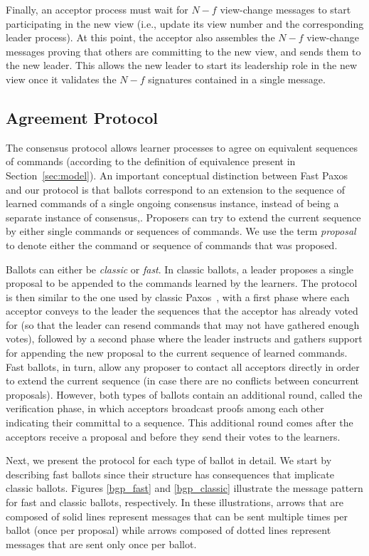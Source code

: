 Finally, an acceptor process must wait for $N-f$ view-change messages to start participating in the new view (i.e., update its view number and the corresponding leader process). At this point, the acceptor also assembles the $N-f$ view-change messages proving that others are committing to the new view, and sends them to the new leader. This allows the new leader to start its leadership role in the new view once it validates the $N-f$ signatures contained in a single message.

\subsection{Agreement Protocol} 

The consensus protocol allows learner processes to agree on equivalent sequences of commands (according to the definition of equivalence present in Section~\ref{sec:model}). An important conceptual distinction between Fast Paxos~\cite{L06} and our protocol is that ballots correspond to an extension to the sequence of learned commands of a single ongoing consensus instance, instead of being a separate instance of consensus,. Proposers can try to extend the current sequence by either single commands or sequences of commands. We use the term \textit{proposal} to denote either the command or sequence of commands that was proposed.\par
Ballots can either be \textit{classic} or \textit{fast}. In classic ballots, a leader proposes a single proposal to be appended to the commands learned by the learners. The protocol is then similar to the one used by classic Paxos~\cite{Lam98}, with a first phase where each acceptor conveys to the leader the sequences that the acceptor has already voted for (so that the leader can resend commands that may not have gathered enough votes), followed by a second phase where the leader instructs and gathers support for appending the new proposal to the current sequence of learned commands. Fast ballots, in turn, allow any proposer to contact all acceptors directly in order to extend the current sequence (in case there are no conflicts between concurrent proposals). However, both types of ballots contain an additional round, called the verification phase, in which acceptors broadcast proofs among each other indicating their committal to a sequence. This additional round comes after the acceptors receive a proposal and before they send their votes to the learners.\par
Next, we present the protocol for each type of ballot in detail. We start by describing fast ballots since their structure has consequences that implicate classic ballots. Figures \ref{bgp_fast} and \ref{bgp_classic} illustrate the message pattern for fast and classic ballots, respectively. In these illustrations, arrows that are composed of solid lines represent messages that can be sent multiple times per ballot (once per proposal) while arrows composed of dotted lines represent messages that are sent only once per ballot.

